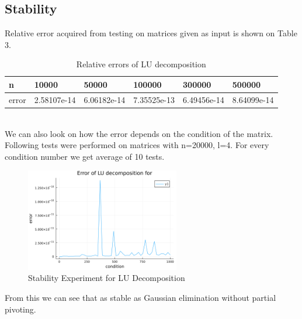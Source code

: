 \documentclass[11pt]{article}
\begin{document}
\subsection*{Stability}
Relative error acquired from testing on matrices given as input is shown on Table $3$.
\begin{table}[!ht]
    \centering
    \begin{tabular}{|l|l|l|l|l|l|}
    \hline
        n & 10000 & 50000 & 100000 & 300000 & 500000 \\ \hline
        error & 2.58107e-14 & 6.06182e-14 & 7.35525e-13 & 6.49456e-14 & 8.64099e-14 \\ \hline
    \end{tabular}
    \caption{Relative errors of LU decomposition} 
\end{table}
\\We can also look on how the error depends on the condition of the matrix.
Following tests were performed on matrices with n=20000, l=4. For every condition number we get average of 10 tests.
\begin{figure}[h]
    \centering
    \includegraphics[width=0.6\textwidth]{lu_error.png}
    \caption{Stability Experiment for LU Decomposition}
\end{figure}
From this we can see that as stable as Gaussian elimination without partial pivoting.
\end{document}
